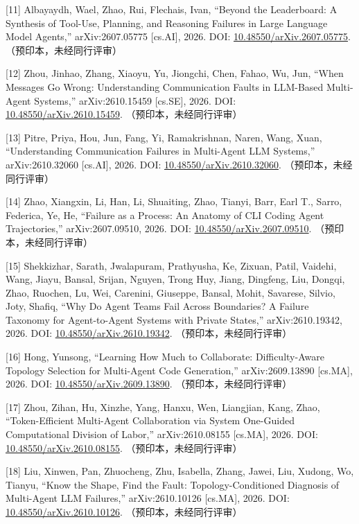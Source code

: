 \documentclass[
]{article}
\begin{document}
{[}11{]} Albayaydh, Wael, Zhao, Rui, Flechais, Ivan, ``Beyond the
Leaderboard: A Synthesis of Tool-Use, Planning, and Reasoning Failures
in Large Language Model Agents,'' arXiv:2607.05775 {[}cs.AI{]}, 2026.
DOI:
\href{https://doi.org/10.48550/arXiv.2607.05775}{10.48550/arXiv.2607.05775}.
（预印本，未经同行评审）

{[}12{]} Zhou, Jinhao, Zhang, Xiaoyu, Yu, Jiongchi, Chen, Fahao, Wu,
Jun, ``When Messages Go Wrong: Understanding Communication Faults in
LLM-Based Multi-Agent Systems,'' arXiv:2610.15459 {[}cs.SE{]}, 2026.
DOI:
\href{https://doi.org/10.48550/arXiv.2610.15459}{10.48550/arXiv.2610.15459}.
（预印本，未经同行评审）

{[}13{]} Pitre, Priya, Hou, Jun, Fang, Yi, Ramakrishnan, Naren, Wang,
Xuan, ``Understanding Communication Failures in Multi-Agent LLM
Systems,'' arXiv:2610.32060 {[}cs.AI{]}, 2026. DOI:
\href{https://doi.org/10.48550/arXiv.2610.32060}{10.48550/arXiv.2610.32060}.
（预印本，未经同行评审）

{[}14{]} Zhao, Xiangxin, Li, Han, Li, Shuaiting, Zhao, Tianyi, Barr,
Earl T., Sarro, Federica, Ye, He, ``Failure as a Process: An Anatomy of
CLI Coding Agent Trajectories,'' arXiv:2607.09510, 2026. DOI:
\href{https://doi.org/10.48550/arXiv.2607.09510}{10.48550/arXiv.2607.09510}.
（预印本，未经同行评审）

{[}15{]} Shekkizhar, Sarath, Jwalapuram, Prathyusha, Ke, Zixuan, Patil,
Vaidehi, Wang, Jiayu, Bansal, Srijan, Nguyen, Trong Huy, Jiang,
Dingfeng, Liu, Dongqi, Zhao, Ruochen, Lu, Wei, Carenini, Giuseppe,
Bansal, Mohit, Savarese, Silvio, Joty, Shafiq, ``Why Do Agent Teams Fail
Across Boundaries? A Failure Taxonomy for Agent-to-Agent Systems with
Private States,'' arXiv:2610.19342, 2026. DOI:
\href{https://doi.org/10.48550/arXiv.2610.19342}{10.48550/arXiv.2610.19342}.
（预印本，未经同行评审）

{[}16{]} Hong, Yunsong, ``Learning How Much to Collaborate:
Difficulty-Aware Topology Selection for Multi-Agent Code Generation,''
arXiv:2609.13890 {[}cs.MA{]}, 2026. DOI:
\href{https://doi.org/10.48550/arXiv.2609.13890}{10.48550/arXiv.2609.13890}.
（预印本，未经同行评审）

{[}17{]} Zhou, Zihan, Hu, Xinzhe, Yang, Hanxu, Wen, Liangjian, Kang,
Zhao, ``Token-Efficient Multi-Agent Collaboration via System One-Guided
Computational Division of Labor,'' arXiv:2610.08155 {[}cs.MA{]}, 2026.
DOI:
\href{https://doi.org/10.48550/arXiv.2610.08155}{10.48550/arXiv.2610.08155}.
（预印本，未经同行评审）

{[}18{]} Liu, Xinwen, Pan, Zhuocheng, Zhu, Isabella, Zhang, Jawei, Liu,
Xudong, Wo, Tianyu, ``Know the Shape, Find the Fault:
Topology-Conditioned Diagnosis of Multi-Agent LLM Failures,''
arXiv:2610.10126 {[}cs.MA{]}, 2026. DOI:
\href{https://doi.org/10.48550/arXiv.2610.10126}{10.48550/arXiv.2610.10126}.
（预印本，未经同行评审）
\end{document}
